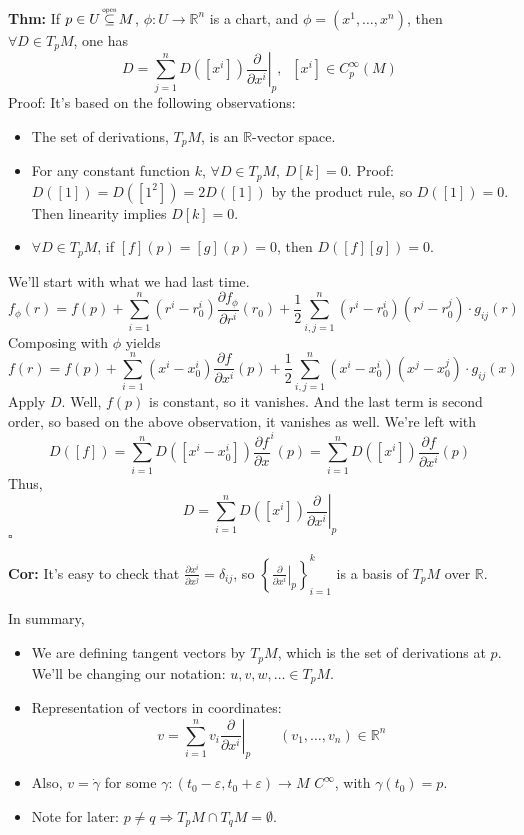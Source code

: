 \documentclass[10pt,letterpaper]{article}
\newcommand{\n}{\hfill\break}
\newcommand{\up}{\vspace{-\baselineskip}}
\newcommand{\hangblock}[2]{\par\noindent\settowidth{\hangindent}{\textbf{#1: }}\textbf{#1: }\!\!\!#2}
\newcommand{\thm}[1]{\hangblock{Thm}{#1}}
\newcommand{\cor}[1]{\hangblock{Cor}{#1}}
\newcommand{\proven}{\;$\square$\n}
\newcommand{\ptxt}[1]{\textrm{\textnormal{#1}}}
\newcommand{\set}[1]{\left\{#1\right\}}
\newcommand{\reals}{\mathbb{R}}
\newcommand{\R}{\reals}
\newcommand{\osubseteq}{\overset{\mathclap{\scalebox{0.5}{\ptxt{open}}}}{\subseteq}}
\newcommand{\pdat}[3]{\left.\pd{#1}{#2}\right|_{#3}}
\newcommand{\restr}[2]{\left.#1\right|_{#2}}
\newcommand{\pd}[2]{\frac{\partial{}#1}{\partial{}#2}}
\begin{document}
\thm{
	If $p\in{}U\osubseteq{}M$, $\phi:U\to\R^{n}$ is a chart, and $\phi=(x^{1},\ldots,x^{n})$, then $\forall{}D\in{}T_{p}M$, one has
	\[
		D=\sum_{j=1}^{n}D([x^{i}])\restr{\pd{}{x^{i}}}{p},\;\;[x^{i}]\in{}C^{\infty}_{p}(M)
	\]
	Proof: It's based on the following observations:
	\begin{itemize}[leftmargin=3.5\parindent]
		\item The set of derivations, $T_{p}M$, is an $\R$-vector space.
		\item For any constant function $k$, $\forall{}D\in{}T_{p}M$, $D[k]=0$.\n
		Proof: $D([1])=D([1^{2}])=2D([1])$ by the product rule, so $D([1])=0$. Then linearity implies $D[k]=0$.
		\item $\forall{}D\in{}T_{p}M$, if $[f](p)=[g](p)=0$, then $D([f][g])=0$.
	\end{itemize}\up\n
	We'll start with what we had last time.
	\[
		f_{\phi}(r)=f(p)+\sum_{i=1}^{n}(r^{i}-r_{0}^{i})\pd{f_{\phi}}{r^{i}}(r_{0})+\frac{1}{2}\sum_{i,j=1}^{n}(r^{i}-r_{0}^{i})(r^{j}-r_{0}^{j})\cdot{}g_{ij}(r)
	\]
	Composing with $\phi$ yields
	\[
		f(r)=f(p)+\sum_{i=1}^{n}(x^{i}-x_{0}^{i})\pd{f}{x^{i}}(p)+\frac{1}{2}\sum_{i,j=1}^{n}(x^{i}-x_{0}^{i})(x^{j}-x_{0}^{j})\cdot{}g_{ij}(x)
	\]
	Apply $D$. Well, $f(p)$ is constant, so it vanishes. And the last term is second order, so based on the above observation, it vanishes as well. We're left with
	\[
		D([f])=\sum_{i=1}^{n}D([x^{i}-x_{0}^{i}])\pd{f}x^{i}(p)=\sum_{i=1}^{n}D([x^{i}])\pd{f}{x^{i}}(p)
	\]
	Thus,
	\[
		D=\sum_{i=1}^{n}D([x^{i}])\restr{\pd{}{x^{i}}}{p}
	\]
	\proven
}

\cor{
	It's easy to check that $\displaystyle\pd{x^{i}}{x^{j}}=\delta_{ij}$, so $\displaystyle\set{\pdat{}{x^{i}}{p}}_{i=1}^{k}$ is a basis of $T_{p}M$ over $\R$.\n
}

\par\noindent
In summary,
\begin{itemize}
	\item We are defining tangent vectors by $T_{p}M$, which is the set of derivations at $p$. We'll be changing our notation: $u,v,w,\ldots\in{}T_{p}M$.
	\item Representation of vectors in coordinates:
	\[
		v=\sum_{i=1}^{n}v_{i}\pdat{}{x^{i}}{p}\qquad(v_{1},\ldots,v_{n})\in\R^{n}
	\]
	\item Also, $v=\dot\gamma$ for some $\gamma:(t_{0}-\varepsilon,t_{0}+\varepsilon)\to{}M$ $C^{\infty}$, with $\gamma(t_{0})=p$.
	\item Note for later: $p\ne{}q\Rightarrow{}T_{p}M\cap{}T_{q}M=\emptyset$.
\end{itemize}
\end{document}
